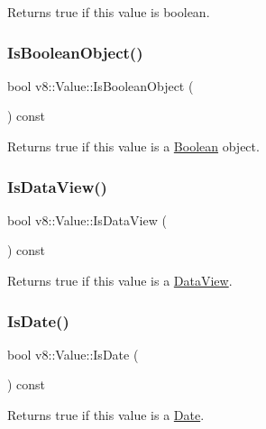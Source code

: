 Returns true if this value is boolean. \mbox{\label{classv8_1_1Value_a4cc64a2761fa8ed852007a2c35ecde8a}} 
\subsubsection{\texorpdfstring{Is\+Boolean\+Object()}{IsBooleanObject()}}
{\footnotesize\ttfamily bool v8\+::\+Value\+::\+Is\+Boolean\+Object (\begin{DoxyParamCaption}{ }\end{DoxyParamCaption}) const}

Returns true if this value is a \mbox{\hyperlink{classv8_1_1Boolean}{Boolean}} object. \mbox{\label{classv8_1_1Value_ad854ff95b445e924a4d78b1b1dc8054b}} 
\subsubsection{\texorpdfstring{Is\+Data\+View()}{IsDataView()}}
{\footnotesize\ttfamily bool v8\+::\+Value\+::\+Is\+Data\+View (\begin{DoxyParamCaption}{ }\end{DoxyParamCaption}) const}

Returns true if this value is a \mbox{\hyperlink{classv8_1_1DataView}{Data\+View}}. \mbox{\label{classv8_1_1Value_aa94f94744aed4d5e731eacf52c8b4801}} 
\subsubsection{\texorpdfstring{Is\+Date()}{IsDate()}}
{\footnotesize\ttfamily bool v8\+::\+Value\+::\+Is\+Date (\begin{DoxyParamCaption}{ }\end{DoxyParamCaption}) const}

Returns true if this value is a \mbox{\hyperlink{classv8_1_1Date}{Date}}. \mbox{\label{classv8_1_1Value_a908070323b8cd593127141a22b79e39d}} 
